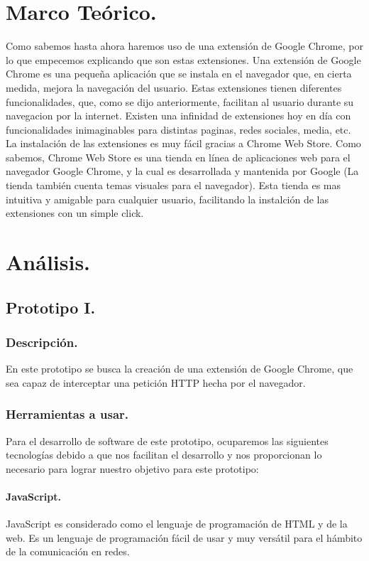 \documentclass[12pt, a4paper, titlepage]{article}
\begin{document}
	\section{\textcolor{azulescom}{Marco Teórico.}}
		Como sabemos hasta ahora haremos uso de una extensión de Google Chrome, por lo que empecemos explicando que son estas extensiones. Una extensión de Google Chrome es una pequeña aplicación que se instala en el navegador que, en cierta medida, mejora la navegación del usuario. Estas extensiones tienen diferentes funcionalidades, que, como se dijo anteriormente, facilitan al usuario durante su navegacion por la internet. Existen una infinidad de extensiones hoy en día con funcionalidades inimaginables para distintas paginas, redes sociales, media, etc. La instalación de las extensiones es muy fácil gracias a Chrome Web Store. Como sabemos, Chrome Web Store es una tienda en línea de aplicaciones web para el navegador Google Chrome, y la cual es desarrollada y mantenida por Google (La tienda también cuenta temas visuales para el navegador). Esta tienda es mas intuitiva y amigable para cualquier usuario, facilitando la instalción de las extensiones con un simple click.
	\newpage
	\section{\textcolor{azulescom}{Análisis.}}
		\subsection{Prototipo I.}
			\subsubsection{Descripción.}
				En este prototipo se busca la creación de una extensión de Google Chrome, que sea capaz de interceptar una petición HTTP hecha por el navegador.
			\subsubsection{Herramientas a usar.}
				
				Para el desarrollo de software de este prototipo, ocuparemos las siguientes tecnologías debido a que nos facilitan el desarrollo y nos proporcionan lo necesario para lograr nuestro objetivo para este prototipo: 
				\paragraph {JavaScript. \\}
				JavaScript es considerado como el lenguaje de programación de HTML y de la web. Es un lenguaje de programación fácil de usar y muy versátil para el hámbito de la comunicación en redes. 
				
\end{document}

